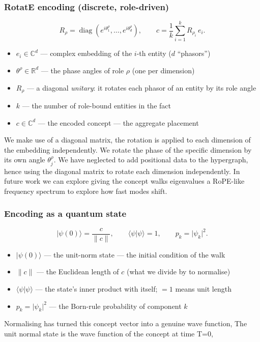 \documentclass[twoside,10pt]{article}
\begin{document}
\subsubsection{RotatE encoding (discrete, role-driven)}
\begin{equation}
  R_{\rho} = \operatorname{diag}\!\left(e^{i\theta^{\rho}_1}, \dots, e^{i\theta^{\rho}_d}\right),
  \qquad
  c = \frac{1}{k}\sum_{i=1}^{k} R_{\rho_i}\, e_i .
\end{equation}

\begin{itemize}
  \item $e_i \in \mathbb{C}^{d}$ --- complex embedding of the $i$-th entity ($d$ ``phasors'')
  \item $\theta^{\rho} \in \mathbb{R}^{d}$ --- the phase angles of role $\rho$ (one per dimension)
  \item $R_{\rho}$ --- a diagonal \emph{unitary}: it rotates each phasor of an entity by its role angle
  \item $k$ --- the number of role-bound entities in the fact
  \item $c \in \mathbb{C}^{d}$ --- the encoded concept --- the aggregate placement
\end{itemize}

We make use of a diagonal matrix, the rotation is applied to each dimension of the embedding independently. 
We rotate the phase of the specific dimension by its own angle $\theta^{\rho}_j$.
We have neglected to add positional data to the hypergraph, hence using the diagonal matrix to rotate each dimension independently. 
In future work we can explore giving the concept walks eigenvalues a RoPE-like frequency spectrum to explore how fast modes shift.

\subsubsection{Encoding as a quantum state}
\begin{equation}
  \lvert\psi(0)\rangle = \frac{c}{\lVert c \rVert},
  \qquad
  \langle\psi\vert\psi\rangle = 1,
  \qquad
  p_k = \lvert \psi_k \rvert^{2}.
\end{equation}

\begin{itemize}
  \item $\lvert\psi(0)\rangle$ --- the unit-norm state --- the initial condition of the walk
  \item $\lVert c \rVert$ --- the Euclidean length of $c$ (what we divide by to normalise)
  \item $\langle\psi\vert\psi\rangle$ --- the state's inner product with itself; $=1$ means unit length
  \item $p_k = \lvert\psi_k\rvert^2$ --- the Born-rule probability of component $k$
\end{itemize}
Normalising has turned this concept vector into a genuine wave function, 
The unit normal state is the wave function of the concept at time T=0, 
\end{document}
